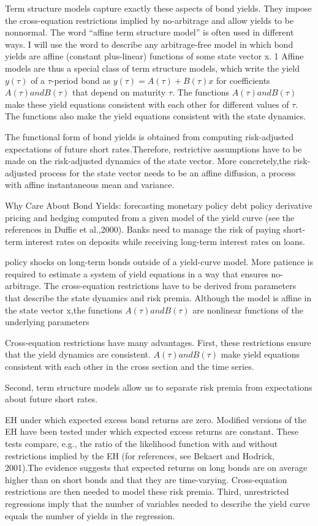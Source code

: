 \documentclass[
]{article}
\begin{document}
Term structure models capture exactly these aspects of bond yields. They impose the
cross-equation restrictions implied by no-arbitrage and allow yields to be nonnormal.
The word ``affine term structure model'' is often used in different ways. I will use the
word to describe any arbitrage-free model in which bond yields are affine (constant plus-linear) functions of some state vector x.
1 Affine models are thus a special class of
term structure models, which write the yield \(y(\tau)\) of a \(\tau\)-period bond as
\(y(\tau) = A(\tau) + B(\tau)x\)
for coefficients \(A(\tau) and B(\tau)\) that depend on maturity \(\tau\). The functions \(A(\tau) and B(\tau)\)
make these yield equations consistent with each other for different values of \(\tau\). The
functions also make the yield equations consistent with the state dynamics.

The functional form of bond yields is obtained from computing risk-adjusted expectations of future short rates.Therefore, restrictive assumptions have to be made on the risk-adjusted dynamics of the state
vector. More concretely,the risk-adjusted process for the state vector needs to be an affine
diffusion, a process with affine instantaneous mean and variance.

Why Care About Bond Yields:
forecasting
monetary policy
debt policy
derivative pricing and hedging
computed from a given
model of the yield curve (see the references in Duffie et al.,2000). Banks need to manage
the risk of paying short-term interest rates on deposits while receiving long-term interest
rates on loans.

policy shocks on long-term bonds outside of a yield-curve model.
More patience is required to estimate a system of yield equations in a way that ensures
no-arbitrage. The cross-equation restrictions have to be derived from parameters that
describe the state dynamics and risk premia. Although the model is affine in the state
vector x,the functions \(A(\tau) and B(\tau)\) are nonlinear functions of the underlying parameters

Cross-equation restrictions have many advantages. First, these restrictions ensure that
the yield dynamics are consistent. \(A(\tau) and B(\tau)\) make yield equations consistent with
each other in the cross section and the time series.

Second, term structure models allow us to separate risk premia from expectations
about future short rates.

EH under which expected excess bond returns are zero. Modified versions of the EH have been tested under which expected excess returns are constant. These tests compare, e.g., the ratio of the likelihood function with and without restrictions implied by the EH (for references, see Bekaert and Hodrick,
2001).The evidence suggests that expected returns on long bonds are on average higher
than on short bonds and that they are time-varying. Cross-equation restrictions are then
needed to model these risk premia.
Third, unrestricted regressions imply that the number of variables needed to describe
the yield curve equals the number of yields in the regression.
\end{document}
